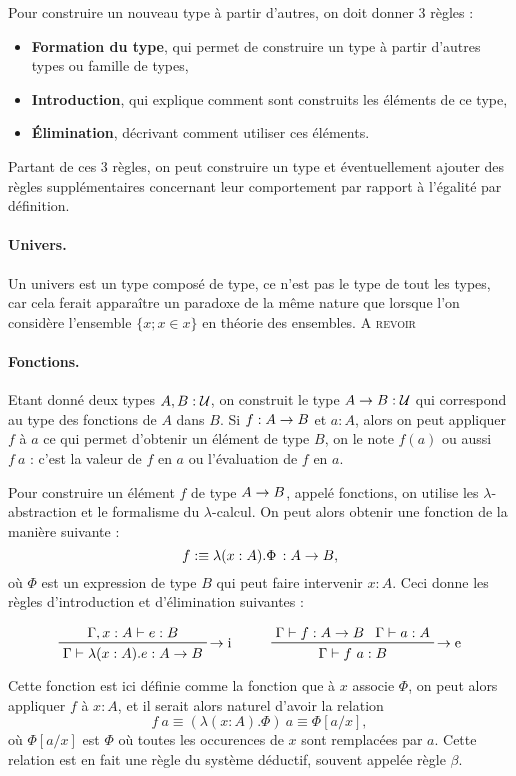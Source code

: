 \documentclass[../../rapport.tex]{subfiles}
\begin{document}
  Pour construire un nouveau type à partir d'autres, on doit donner 3 règles :
  \begin{itemize}
    \item \textbf{Formation du type}, qui permet de construire un type à partir d'autres types ou famille de types,
    \item \textbf{Introduction}, qui explique comment sont construits les éléments de ce type,
    \item \textbf{Élimination}, décrivant comment utiliser ces éléments.
  \end{itemize}

  Partant de ces 3 règles, on peut construire un type et éventuellement ajouter des règles supplémentaires concernant
  leur comportement par rapport à l'égalité par définition.

  \paragraph{Univers.}

  Un univers est un type composé de type, ce n'est pas le type de tout les types,
  car cela ferait apparaître un paradoxe de la même nature que lorsque l'on considère l'ensemble
  $\{x ; x \in x\}$ en théorie des ensembles.
  \textsc{A revoir}

  \paragraph{Fonctions.}

  Etant donné deux types $A, B : \mathcal U$, on construit le type $A \rightarrow B : \mathcal U$ qui correspond au type des fonctions
  de $A$ dans $B$.
  Si $f : A \rightarrow B$ et $a : A$, alors on peut appliquer $f$ à $a$ ce qui permet d'obtenir un élément de type $B$,
  on le note $f(a)$ ou aussi $f\ a$ : c'est la valeur de $f$ en $a$ ou l'évaluation de $f$ en $a$.

  Pour construire un élément $f$ de type $A \rightarrow B$, appelé fonctions, on utilise les $\lambda$-abstraction
  et le formalisme du $\lambda$-calcul.
  On peut alors obtenir une fonction de la manière suivante :
  $$f :\equiv \lambda (x : A). \Phi \, : A \rightarrow B,$$
  où $\Phi$ est un expression de type $B$ qui peut faire intervenir $x : A$.
  Ceci donne les règles d'introduction et d'élimination suivantes :

  $$
  \prftree[r]{$\fun \text{i}$}{\Gamma, x : A \vdash e : B}{\Gamma \vdash \lambda (x : A). e : A \fun B} \hspace{1cm}
  \prftree[r]{$\fun \text{e}$}{\Gamma \vdash f : A \fun B}{\Gamma \vdash a : A}{\Gamma \vdash f\ a : B}
  $$

  Cette fonction est ici définie comme la fonction que à $x$ associe $\Phi$,
  on peut alors appliquer $f$ à $x : A$, et il serait alors naturel d'avoir la relation
  $$f\ a \equiv (\lambda (x : A). \Phi)\ a \equiv \Phi [a/x],$$
  où $\Phi [a/x]$ est $\Phi$ où toutes les occurences de $x$ sont remplacées par $a$.
  Cette relation est en fait une règle du système déductif, souvent appelée règle $\beta$.
\end{document}
